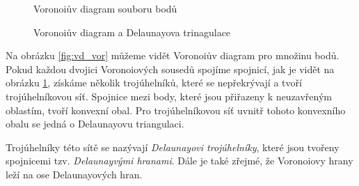 \documentclass[12pt,a4paper]{article}
\begin{document}
{\begin{figure}[h!]
\centering
\begin{floatrow}
{\caption{Voronoiův diagram souboru bodů}\label{fig:vd_vor}}
{\caption{Voronoiův diagram a Delaunayova trinagulace}\label{fig:vd_del}}
\end{floatrow}
\end{figure}

Na obrázku \ref{fig:vd_vor} můžeme vidět Voronoiův diagram pro množinu
bodů. Pokud každou dvojici Voronoiových sousedů spojíme spojnicí, jak
je vidět na obrázku \ref{fig:vd_del}, získáme několik trojúhelníků,
které se nepřekrývají a tvoří trojúhelníkovou síť. Spojnice mezi body,
které jsou přiřazeny k neuzavřeným oblastím, tvoří konvexní obal. Pro
trojúhelníkovou síť uvnitř tohoto konvexního obalu se jedná o
Delaunayovu triangulaci.

Trojúhelníky této sítě se nazývají \emph{Delaunayovi trojúhelníky},
které jsou tvořeny spojnicemi tzv. \emph{Delaunayvými hranami}. Dále
je také zřejmé, že Voronoiovy hrany leží na ose Delaunayových hran.


\newpage
}
\end{document}
